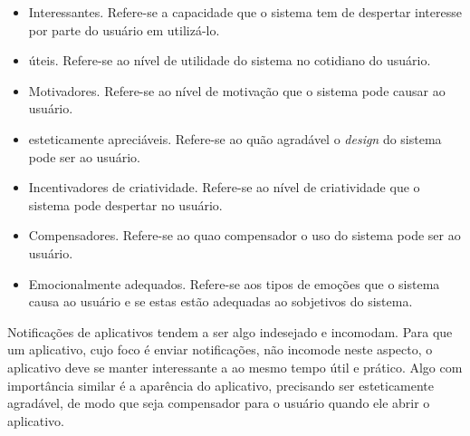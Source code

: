     \begin{itemize}
       \item Interessantes.
       \subitem Refere-se a capacidade que o sistema tem de despertar interesse por parte do usuário em utilizá-lo.
    \end{itemize}
    
    \begin{itemize}
       \item úteis.
       \subitem Refere-se ao nível de utilidade do sistema no cotidiano do usuário.
    \end{itemize}
    
    \begin{itemize}
       \item Motivadores.
       \subitem Refere-se ao nível de motivação que o sistema pode causar ao usuário.
    \end{itemize}
    
    \begin{itemize}
       \item esteticamente apreciáveis.
       \subitem Refere-se ao quão agradável o \textit{design} do sistema pode ser ao usuário.
    \end{itemize}
    
    \begin{itemize}
       \item Incentivadores de criatividade.
       \subitem Refere-se ao nível de criatividade que o sistema pode despertar no usuário.
    \end{itemize}
    
    \begin{itemize}
       \item Compensadores.
       \subitem Refere-se ao quao compensador o uso do sistema pode ser ao usuário.
    \end{itemize}
    
    \begin{itemize}
       \item Emocionalmente adequados.
       \subitem Refere-se aos tipos de emoções que o sistema causa ao usuário e se estas estão adequadas ao sobjetivos do sistema.
    \end{itemize}
    
    Notificações de aplicativos tendem a ser algo indesejado e incomodam. Para que um aplicativo, cujo foco é enviar notificações,
    não incomode neste aspecto, o aplicativo deve se manter interessante a ao mesmo tempo útil e prático. Algo com importância similar
    é a aparência do aplicativo, precisando ser esteticamente agradável, de modo que seja compensador para o usuário quando ele abrir 
    o aplicativo. 